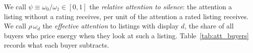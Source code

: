 We call $\psi\equiv\omega_0/\omega_1\in[0,1]$ the \emph{relative attention to silence}: the attention a listing without a rating receives, per unit of the attention a rated listing receives. We call $\rho\,\omega_d$ the \emph{effective attention} to listings with display $d$, the share of all buyers who price energy when they look at such a listing. Table~\ref{tab:att_buyers} records what each buyer subtracts.
